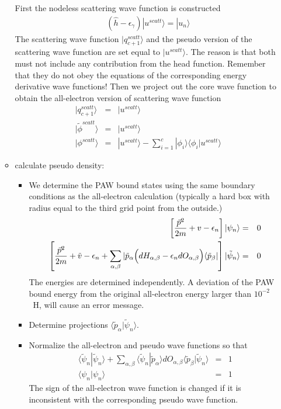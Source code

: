 \documentclass[11pt,a4paper]{report}
\begin{document}
\begin{enumerate}
\begin{itemize}
First the nodeless scattering wave function is constructed
\begin{eqnarray*}
(\hat{h}-\epsilon_\gamma)|u^{scatt}\rangle=|u_n\rangle
\end{eqnarray*}
The scattering wave function $|q^{scatt}_{c+1}\rangle$
and the pseudo version of the scattering wave function are set equal
to $|u^{scatt}\rangle$. The reason is that both must not include any
contribution from the head function. Remember that they do not obey
the equations of the corresponding energy derivative wave functions!
Then we project out the core wave function to obtain the all-electron
version of scattering wave function
\begin{eqnarray*}
|q_{c+1}^{scatt}\rangle&=&|u^{scatt}\rangle
\\
|\tilde{\phi}^{scatt}\rangle&=&|u^{scatt}\rangle
\\
|\phi^{scatt}\rangle&=&|u^{scatt}\rangle-\sum_{i=1}^c |\phi_i\rangle\langle\phi_i|u^{scatt}\rangle
\end{eqnarray*}

\item calculate pseudo density: 
\begin{itemize}
\item We determine the PAW bound states
  using the same boundary conditions as the all-electron calculation
  (typically a hard box with radius equal to the third grid point from
  the outside.)
\begin{eqnarray*}
\left[\frac{\vec{p}^2}{2m}+v-\epsilon_n
\right]|\psi_n\rangle&=&0
\\
\left[\frac{\vec{p}^2}{2m}+\tilde{v}-\epsilon_n
+\sum_{\alpha,\beta}|\tilde{p}_\alpha\Bigl(
dH_{\alpha,\beta}-\epsilon_n dO_{\alpha,\beta}\Bigr)
\langle\tilde{p}_\beta|\right]|\tilde\psi_n\rangle&=&0
\end{eqnarray*}
The energies are determined independently. A deviation of the PAW
bound energy from the original all-electron energy larger than
$10^{-2}$~H, will cause an error message.

\item Determine projections $\langle\tilde{p}_\alpha|\tilde\psi_n\rangle$.

\item Normalize the all-electron and pseudo wave functions so that
\begin{eqnarray*}
\langle\tilde{\psi}_n|\tilde{\psi}_n\rangle
+\sum_{\alpha,\beta}\langle\tilde{\psi}_n|\tilde{p}_\alpha\rangle dO_{\alpha,\beta}
\langle\tilde{p}_\beta|\tilde{\psi}_n\rangle &=&1
\\
\langle\psi_n|\psi_n\rangle&=&1
\end{eqnarray*}
The sign of the all-electron wave function is changed if it is
inconsistent with the corresponding pseudo wave function.


\end{itemize}
\end{itemize}
\end{enumerate}
\end{document}

